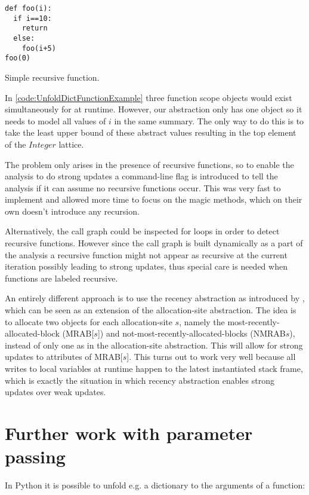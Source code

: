 \begin{listing}[H]
	\begin{verbatim}
def foo(i):
  if i==10:
    return
  else:
    foo(i+5)
foo(0)
	\end{verbatim}
\caption{Simple recursive function.}
\label{code:UnfoldDictFunctionExample}
\end{listing}

In \autoref{code:UnfoldDictFunctionExample} three function scope objects would exist simultaneously for  at runtime. However, our abstraction only has one object so it needs to model all values of $i$ in the same summary. The only way to do this is to take the least upper bound of these abstract values resulting in the top element of the $Integer$ lattice.

The problem only arises in the presence of recursive functions, so to enable the analysis to do strong updates a command-line flag is introduced to tell the analysis if it can assume no recursive functions occur. This was very fast to implement and allowed more time to focus on the magic methods, which on their own doesn't introduce any recursion.

Alternatively, the call graph could be inspected for loops in order to detect recursive functions. However since the call graph is built dynamically as a part of the analysis a recursive function might not appear as recursive at the current iteration possibly leading to strong updates, thus special care is needed when functions are labeled recursive.

An entirely different approach is to use the recency abstraction as introduced by \cite{recency}, which can be seen as an extension of the allocation-site abstraction. The idea is to allocate two objects for each allocation-site $s$, namely the most-recently-allocated-block (MRAB[$s$]) and not-most-recently-allocated-blocks (NMRAB$s$), instead of only one as in the allocation-site abstraction. This will allow for strong updates to attributes of MRAB[$s$]. This turns out to work very well because all writes to local variables at runtime happen to the latest instantiated stack frame, which is exactly the situation in which recency abstraction enables strong updates over weak updates.


\section{Further work with parameter passing}
In Python it is possible to unfold e.g. a dictionary to the arguments of a function:


